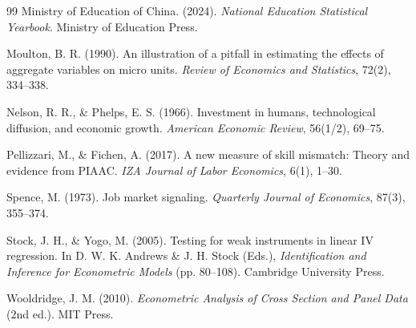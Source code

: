 \documentclass[12pt,a4paper]{article}
\theoremstyle{predstyle}
\theoremstyle{plain}
\begin{document}
\begin{thebibliography}{99}
Ministry of Education of China. (2024). \textit{National Education Statistical Yearbook}. Ministry of Education Press.

Moulton, B. R. (1990). An illustration of a pitfall in estimating the effects of aggregate variables on micro units. \textit{Review of Economics and Statistics}, 72(2), 334--338.

Nelson, R. R., \& Phelps, E. S. (1966). Investment in humans, technological diffusion, and economic growth. \textit{American Economic Review}, 56(1/2), 69--75.

Pellizzari, M., \& Fichen, A. (2017). A new measure of skill mismatch: Theory and evidence from PIAAC. \textit{IZA Journal of Labor Economics}, 6(1), 1--30.

Spence, M. (1973). Job market signaling. \textit{Quarterly Journal of Economics}, 87(3), 355--374.

Stock, J. H., \& Yogo, M. (2005). Testing for weak instruments in linear IV regression. In D. W. K. Andrews \& J. H. Stock (Eds.), \textit{Identification and Inference for Econometric Models} (pp. 80--108). Cambridge University Press.

Wooldridge, J. M. (2010). \textit{Econometric Analysis of Cross Section and Panel Data} (2nd ed.). MIT Press.

\end{thebibliography}
\end{document}
